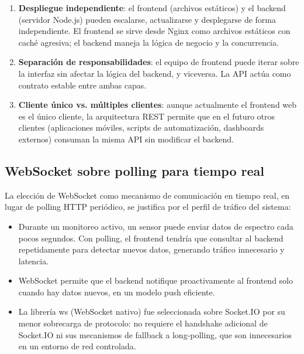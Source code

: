 \begin{enumerate}
    \item \textbf{Despliegue independiente}: el frontend (archivos estáticos) y
    el backend (servidor Node.js) pueden escalarse, actualizarse y
    desplegarse de forma independiente. El frontend se sirve desde Nginx como
    archivos estáticos con caché agresiva; el backend maneja la lógica de
    negocio y la concurrencia.

    \item \textbf{Separación de responsabilidades}: el equipo de frontend
    puede iterar sobre la interfaz sin afectar la lógica del backend, y
    viceversa. La API actúa como contrato estable entre ambas capas.

    \item \textbf{Cliente único vs. múltiples clientes}: aunque actualmente el
    frontend web es el único cliente, la arquitectura REST permite que en el
    futuro otros clientes (aplicaciones móviles, scripts de automatización,
    dashboards externos) consuman la misma API sin modificar el backend.
\end{enumerate}

\subsection{WebSocket sobre polling para tiempo real}

La elección de WebSocket como mecanismo de comunicación en tiempo real, en
lugar de polling HTTP periódico, se justifica por el perfil de tráfico del
sistema:

\begin{itemize}
    \item Durante un monitoreo activo, un sensor puede enviar datos de
    espectro cada pocos segundos. Con polling, el frontend tendría que
    consultar al backend repetidamente para detectar nuevos datos, generando
    tráfico innecesario y latencia.

    \item WebSocket permite que el backend notifique proactivamente al
    frontend solo cuando hay datos nuevos, en un modelo push eficiente.

    \item La librería ws (WebSocket nativo) fue seleccionada sobre Socket.IO
    por su menor sobrecarga de protocolo: no requiere el handshake adicional
    de Socket.IO ni sus mecanismos de fallback a long-polling, que son
    innecesarios en un entorno de red controlada.
\end{itemize}


